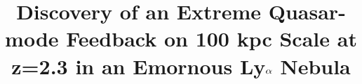 
\usepackage{subfiles}
\usepackage{subfig}
\usepackage{kantlipsum}




\title{Discovery of an Extreme Quasar-mode Feedback on 100 kpc Scale at z=2.3 in an Emornous Ly$\rm \alpha$ Nebula}




%






